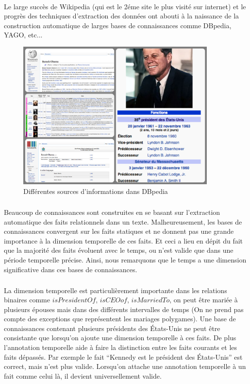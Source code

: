 \documentclass[12pt,a4	]{report}
\begin{document}
\paragraph{}
Le large succès de Wikipedia (qui est le 2éme site le plus visité sur internet) et le progrès des techniques d’extraction des données ont abouti à la naissance de la construction automatique  de larges bases de connaissances comme DBpedia, YAGO, etc...
\begin{figure}[H]
\centering
\includegraphics[width=10cm]{Sources.png}
\caption{Différentes sources d'informations dans DBpedia}
\end{figure}
\subparagraph{}
Beaucoup de connaissances sont construites en se basant sur l’extraction automatique des faits relationnels dans un texte.
Malheureusement, les bases de connaissances convergent sur les faits statiques et ne donnent pas une grande importance à la dimension temporelle de ces faits.
Et ceci a lieu en dépit du fait que la majorité des faits évoluent avec le temps, ou n'est valide que dans une période temporelle précise. Ainsi, nous remarquons que le temps a une dimension significative dans ces bases de connaissances.
\subparagraph{}
La dimension temporelle est particulièrement importante dans les relations binaires comme $isPresidentOf$, $isCEOof$, $isMarriedTo$, on peut être mariée à plusieurs épouses mais dans des différents intervalles de temps (On ne prend pas compte des exceptions que représentent les mariages polygames).
Une base de connaissances contenant plusieurs présidents des États-Unis ne peut être consistante que lorsqu’on ajoute une dimension temporelle à ces faits. De plus l’annotation temporelle aide à faire la distinction entre les faits courants et les faits dépassés.
Par exemple le fait ``Kennedy est le président des États-Unis'' est correct, mais n'est plus valide.
Lorsqu’on attache une annotation temporelle à un fait comme celui là, il devient universellement valide.
\end{document}
